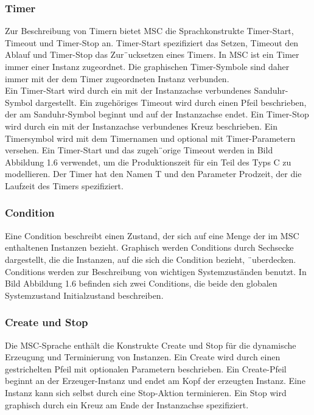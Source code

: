 \subsubsection{Timer}
Zur Beschreibung von Timern bietet MSC die Sprachkonstrukte
Timer-Start, Timeout und Timer-Stop an. Timer-Start
spezifiziert das Setzen, Timeout den Ablauf und Timer-Stop das Zur¨ucksetzen eines Timers. In MSC ist ein Timer
immer einer Instanz zugeordnet. Die graphischen Timer-Symbole sind daher immer mit der dem Timer zugeordneten
Instanz verbunden.\\

Ein Timer-Start wird durch ein mit der Instanzachse
verbundenes Sanduhr-Symbol dargestellt. Ein zugehöriges
Timeout wird durch einen Pfeil beschrieben, der am
Sanduhr-Symbol beginnt und auf der Instanzachse endet.
Ein Timer-Stop wird durch ein mit der Instanzachse verbundenes
Kreuz beschrieben. Ein Timersymbol wird mit
dem Timernamen und optional mit Timer-Parametern versehen.
Ein Timer-Start und das zugeh¨orige Timeout werden
in Bild Abbildung 1.6 verwendet, um die Produktionszeit für ein Teil des
Typs C zu modellieren. Der Timer hat den Namen T und
den Parameter Prodzeit, der die Laufzeit des Timers
spezifiziert.\\
\subsubsection{Condition}
Eine Condition beschreibt einen Zustand, der sich auf
eine Menge der im MSC enthaltenen Instanzen bezieht.
Graphisch werden Conditions durch Sechsecke dargestellt,
die die Instanzen, auf die sich die Condition bezieht,
¨uberdecken. Conditions werden zur Beschreibung von
wichtigen Systemzuständen benutzt. In Bild Abbildung 1.6 befinden sich
zwei Conditions, die beide den globalen Systemzustand
Initialzustand beschreiben.\\
\subsubsection{Create und Stop}
Die MSC-Sprache enthält die Konstrukte Create und Stop
für die dynamische Erzeugung und Terminierung von Instanzen.
Ein Create wird durch einen gestrichelten Pfeil
mit optionalen Parametern beschrieben. Ein Create-Pfeil
beginnt an der Erzeuger-Instanz und endet am Kopf der erzeugten
Instanz. Eine Instanz kann sich selbst durch eine
Stop-Aktion terminieren. Ein Stop wird graphisch durch ein
Kreuz am Ende der Instanzachse spezifiziert.\\

